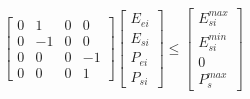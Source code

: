 \documentclass[11pt]{article} %
\begin{document}
\begin{align} 
    \begin{bmatrix}
        0 & 1 & 0 & 0\\
        0 & -1 & 0 & 0\\
        0 & 0 & 0 & -1\\
        0 & 0 & 0 & 1
    \end{bmatrix} 
    \begin{bmatrix}
        E_{ei}\\
        E_{si}\\
        P_{ei}\\
        P_{si}
    \end{bmatrix} \leq
    \begin{bmatrix}
        E_{si}^{max}\\
        E_{si}^{min}\\
        0\\
        P_{s}^{max}
    \end{bmatrix}
\end{align}
\end{document}
